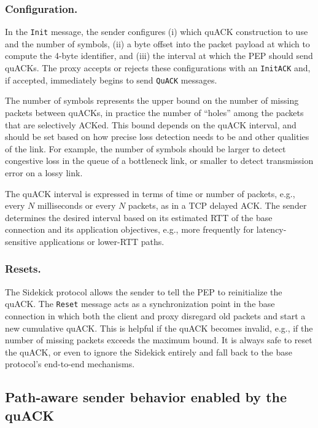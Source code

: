 \subsubsection{Configuration.}
In the \texttt{Init} message, the sender configures (i) which quACK construction
to use and the number of symbols, (ii) a byte offset into the packet payload at
which to compute the 4-byte identifier, and (iii) the interval at which the PEP
should send quACKs.
The proxy accepts or rejects these configurations with an \texttt{InitACK}
and, if accepted, immediately begins to send \texttt{QuACK} messages.

The number of symbols represents the upper bound on the number of missing
packets between quACKs, in practice the number of ``holes'' among the packets
that are selectively ACKed. This bound depends on the quACK interval, and
should be set based on how precise loss detection needs to be and other
qualities of the link. For example, the number of symbols should be larger to
detect congestive loss in the queue of a bottleneck link, or smaller to detect
transmission error on a lossy link.

The quACK interval is expressed in terms of time or number of packets,
 e.g., every $N$ milliseconds or every $N$ packets, as in a TCP delayed ACK.
The sender determines the desired interval based on its estimated
RTT of the base connection and its application objectives, e.g.,
more frequently for latency-sensitive applications or lower-RTT paths.

\subsubsection{Resets.}
The Sidekick protocol allows the sender to tell the PEP to reinitialize the
quACK. The \texttt{Reset} message acts as a synchronization point in the base
connection in which both the client and proxy disregard old packets and start
a new cumulative quACK. This is helpful if the quACK becomes invalid, e.g.,
if the number of missing packets exceeds the maximum bound. It is always safe
to reset the quACK, or even to ignore the Sidekick entirely and fall back to the
base protocol's end-to-end mechanisms.


\subsection{Path-aware sender behavior enabled by the quACK}
\label{sec:sidekick:sender}

